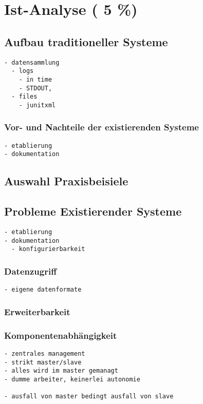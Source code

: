 \chapter{Ist-Analyse ( 5 \%)}
\label{chap:ist-analyse}


\section{Aufbau traditioneller Systeme}

\begin{verbatim}
- datensammlung
  - logs
    - in time
    - STDOUT,
  - files
    - junitxml
\end{verbatim}

\subsection{Vor- und Nachteile der existierenden Systeme}

\begin{verbatim}
- etablierung
- dokumentation
\end{verbatim}


\section{Auswahl Praxisbeisiele}

\section{Probleme Existierender Systeme}

\begin{verbatim}
- etablierung
- dokumentation
  - konfigurierbarkeit
\end{verbatim}

\subsection{Datenzugriff}
\begin{verbatim}
- eigene datenformate
\end{verbatim}
\subsection{Erweiterbarkeit}

\subsection{Komponentenabh\"angigkeit}
\begin{verbatim}
- zentrales management
- strikt master/slave
- alles wird im master gemanagt
- dumme arbeiter, keinerlei autonomie

- ausfall von master bedingt ausfall von slave


\end{verbatim}

